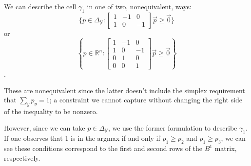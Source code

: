 \documentclass[12pt]{article}
\newcommand{\reals}{\mathbb{R}}
\newcommand{\simplex}{\Delta_\Y}
\newcommand{\Y}{\mathcal{Y}}
\begin{document}
We can describe the cell $\gamma_1$ in one of two, nonequivalent, ways:
\[
\{p \in \simplex: 
\begin{bmatrix}
1 & -1 & 0\\
1 & 0 & -1
\end{bmatrix} \vec p \geq \vec 0 \}
\]
or
\[
\left\{p \in \reals^n: 
\begin{bmatrix}
1 & -1 & 0\\
1 & 0 & -1\\
0 & 1 & 0\\
0 & 0 & 1
\end{bmatrix} \vec p \geq \vec 0 \right\}
\].

These are nonequivalent since the latter doesn't include the simplex requirement that $\sum_y p_y = 1$; a constraint we cannot capture without changing the right side of the inequality to be nonzero.

However, since we can take $p \in \simplex$, we use the former formulation to describe $\gamma_1$.
If one observes that $1$ is in the argmax if and only if $p_1 \geq p_2$ and $p_1 \geq p_3$, we can see these conditions correspond to the first and second rows of the $B^1$ matrix, respectively.
\end{document}
